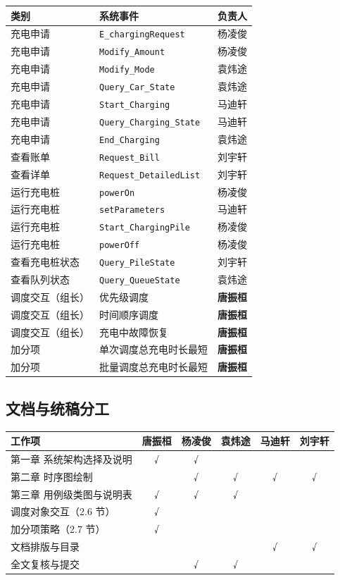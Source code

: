 \documentclass[a4paper,11pt]{ctexart}
\begin{document}
\begin{longtable}{p{3.0cm}p{6.4cm}p{2.8cm}}
\toprule
\textbf{类别} & \textbf{系统事件} & \textbf{负责人} \\
\midrule
\endhead
充电申请 & \texttt{E\_chargingRequest} & 杨凌俊 \\
充电申请 & \texttt{Modify\_Amount} & 杨凌俊 \\
充电申请 & \texttt{Modify\_Mode} & 袁炜途 \\
充电申请 & \texttt{Query\_Car\_State} & 袁炜途 \\
充电申请 & \texttt{Start\_Charging} & 马迪轩 \\
充电申请 & \texttt{Query\_Charging\_State} & 马迪轩 \\
充电申请 & \texttt{End\_Charging} & 袁炜途 \\
查看账单 & \texttt{Request\_Bill} & 刘宇轩 \\
查看详单 & \texttt{Request\_DetailedList} & 刘宇轩 \\
运行充电桩 & \texttt{powerOn} & 杨凌俊 \\
运行充电桩 & \texttt{setParameters} & 马迪轩 \\
运行充电桩 & \texttt{Start\_ChargingPile} & 杨凌俊 \\
运行充电桩 & \texttt{powerOff} & 杨凌俊 \\
查看充电桩状态 & \texttt{Query\_PileState} & 刘宇轩 \\
查看队列状态 & \texttt{Query\_QueueState} & 袁炜途 \\
调度交互（组长） & 优先级调度 & \textbf{唐振桓} \\
调度交互（组长） & 时间顺序调度 & \textbf{唐振桓} \\
调度交互（组长） & 充电中故障恢复 & \textbf{唐振桓} \\
加分项 & 单次调度总充电时长最短 & \textbf{唐振桓} \\
加分项 & 批量调度总充电时长最短 & \textbf{唐振桓} \\
\bottomrule
\end{longtable}

\subsection{文档与统稿分工}

\begin{longtable}{p{4.6cm}ccccc}
\toprule
\textbf{工作项} & 唐振桓 & 杨凌俊 & 袁炜途 & 马迪轩 & 刘宇轩 \\
\midrule
\endhead
第一章 系统架构选择及说明 & √ & √ & & & \\
第二章 时序图绘制 & & √ & √ & √ & √ \\
第三章 用例级类图与说明表 & √ & √ & √ & & \\
调度对象交互（2.6 节） & √ & & & & \\
加分项策略（2.7 节） & √ & & & & \\
文档排版与目录 & & & & √ & √ \\
全文复核与提交 & & √ & √ & & \\
\bottomrule
\end{longtable}
\end{document}
